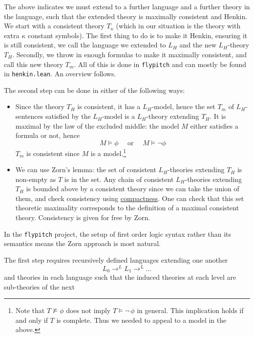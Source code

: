 \documentclass{article}
\newcommand{\NOT}{\neg\,}
\newcommand{\<}{\langle}
\renewcommand{\>}{\rangle}
\newcommand{\linkto}[2]{\hyperlink{#1}{#2}}
\theoremstyle{definitionstyle}
\theoremstyle{exercisestyle}
\theoremstyle{remarkstyle}
\begin{document}
The above indicates we must extend to a further language and a further theory
in the language, such that the extended theory is maximally consistent and Henkin.
We start with a consistent theory $T_{\kappa}$
(which in our situation is the theory with extra $\kappa$ constant symbols).
The first thing to do is to make it Henkin, ensuring it is still consistent,
we call the language we extended to $L_{H}$ and the new $L_{H}$-theory $T_{H}$.
Secondly, we throw in enough formulas to make it maximally consistent,
and call this new theory $T_{m}$.
All of this is done in \texttt{flypitch} and can mostly be found in \texttt{henkin.lean}.
An overview follows.

The second step can be done in either of the following ways:
\begin{itemize}
  \item Since the theory $T_{H}$ is consistent, it has a $L_{H}$-model,
        hence the set $T_{m}$ of $L_{H}$-sentences satisfied by the $L_{H}$-model is a
        $L_{H}$-theory extending $T_{H}$.
        It is maximal by the law of the excluded middle:
        the model $M$ either satisfies a formula or not,
        hence
        \[ M \vDash \phi \quad \text{ or } \quad M \vDash \neg \phi \]
        $T_{m}$ is consistent since $M$ is a model.\footnote{Note that
          $T \nvDash \phi$ does not imply $T \vDash \NOT \phi$ in general.
          This implication holds if and only if $T$ is complete.
          Thus we needed to appeal to a model in the above.}
  \item We can use Zorn's lemma: the set of consistent $L_{H}$-theories extending
        $T_{H}$ is non-empty as $T$ is in the set.
        Any chain of consistent $L_{H}$-theories extending $T_{H}$ is bounded
        above by a consistent theory since we can take the union of them,
        and check consistency using \linkto{compactness_consistency}{compactness}.
        One can check that this set theoretic maximality corresponds to
        the definition of a maximal consistent theory.
        Consistency is given for free by Zorn.
\end{itemize}
In the \texttt{flypitch} project, the setup of first order logic
syntax rather than its semantics means the Zorn approach is most natural.

The first step requires recursively defined languages extending one another
\[ L_{0} \to^{L} L_{1} \to^{L} \dots \]
and theories in each language such that the induced theories
at each level are sub-theories of the next
\end{document}

